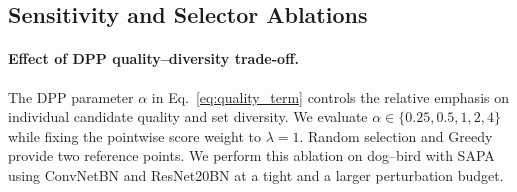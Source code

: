 \subsection{Sensitivity and Selector Ablations}
\label{sec:selector-sensitivity}

\paragraph{Effect of DPP quality--diversity trade-off.}
The DPP parameter $\alpha$ in Eq.~\eqref{eq:quality_term} controls the
relative emphasis on individual candidate quality and set diversity. We
evaluate $\alpha\in\{0.25,0.5,1,2,4\}$ while fixing the pointwise score
weight to $\lambda=1$. Random selection and Greedy provide two reference
points. We perform this ablation on dog--bird with SAPA using ConvNetBN
and ResNet20BN at a tight and a larger perturbation budget.

\begin{table}[t]
\centering
\caption{
Sensitivity to the DPP quality parameter $\alpha$. We fix $\lambda=1$
and evaluate SAPA on dog--bird. Random and Greedy are independent of
$\alpha$. Entries report ASR (\%), with clean test accuracy in
parentheses.
}
\label{tab:alpha-ablation}
\small
\setlength{\tabcolsep}{4.5pt}
\renewcommand{\arraystretch}{1.10}
\end{table}


